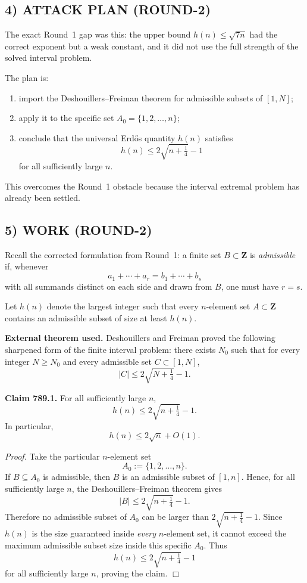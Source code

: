 \subsection*{4) ATTACK PLAN (ROUND-2)}

The exact Round~1 gap was this: the upper bound \(h(n)\le \sqrt{7n}\) had the correct exponent but a weak constant, and it did not use the full strength of the solved interval problem.

The plan is:

\begin{enumerate}
\item import the Deshouillers--Freiman theorem for admissible subsets of \([1,N]\);
\item apply it to the specific set \(A_0=\{1,2,\dots,n\}\);
\item conclude that the universal Erd\H{o}s quantity \(h(n)\) satisfies
\[
h(n)\le 2\sqrt{n+\tfrac14}-1
\]
for all sufficiently large \(n\).
\end{enumerate}

This overcomes the Round~1 obstacle because the interval extremal problem has already been settled.

\subsection*{5) WORK (ROUND-2)}

Recall the corrected formulation from Round~1: a finite set \(B\subset \mathbf{Z}\) is \emph{admissible} if, whenever
\[
a_1+\cdots+a_r=b_1+\cdots+b_s
\]
with all summands distinct on each side and drawn from \(B\), one must have \(r=s\).

Let \(h(n)\) denote the largest integer such that every \(n\)-element set \(A\subset \mathbf{Z}\) contains an admissible subset of size at least \(h(n)\).

\medskip
\noindent\textbf{External theorem used.}
Deshouillers and Freiman proved the following sharpened form of the finite interval problem: there exists \(N_0\) such that for every integer \(N\ge N_0\) and every admissible set \(C\subset [1,N]\),
\[
|C|\le 2\sqrt{N+\tfrac14}-1.
\]

\medskip
\noindent\textbf{Claim 789.1.}
For all sufficiently large \(n\),
\[
h(n)\le 2\sqrt{n+\tfrac14}-1.
\]
In particular,
\[
h(n)\le 2\sqrt n + O(1).
\]

\medskip
\noindent\emph{Proof.}
Take the particular \(n\)-element set
\[
A_0:=\{1,2,\dots,n\}.
\]
If \(B\subseteq A_0\) is admissible, then \(B\) is an admissible subset of \([1,n]\). Hence, for all sufficiently large \(n\), the Deshouillers--Freiman theorem gives
\[
|B|\le 2\sqrt{n+\tfrac14}-1.
\]
Therefore no admissible subset of \(A_0\) can be larger than \(2\sqrt{n+\tfrac14}-1\). Since \(h(n)\) is the size guaranteed inside \emph{every} \(n\)-element set, it cannot exceed the maximum admissible subset size inside this specific \(A_0\). Thus
\[
h(n)\le 2\sqrt{n+\tfrac14}-1
\]
for all sufficiently large \(n\), proving the claim.
\hfill\(\Box\)

